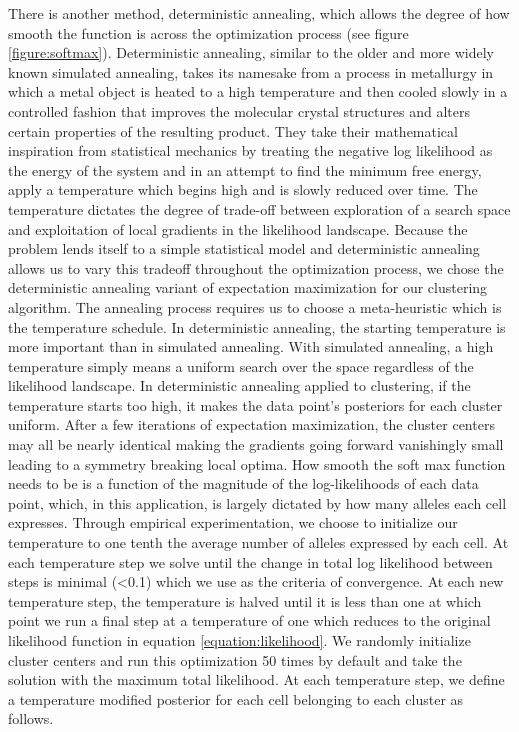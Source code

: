 \par{
There is another method, deterministic annealing, which allows the degree of how smooth the function is across the optimization process \cite{annealing}\cite{annealing2} (see figure \ref{figure:softmax}). Deterministic annealing, similar to the older and more widely known simulated annealing\cite{simannealing}, takes its namesake from a process in metallurgy in which a metal object is heated to a high temperature and then cooled slowly in a controlled fashion that improves the molecular crystal structures and alters certain properties of the resulting product. They take their mathematical inspiration from statistical mechanics by treating the negative log likelihood as the energy of the system and in an attempt to find the minimum free energy, apply a temperature which begins high and is slowly reduced over time. The temperature dictates the degree of trade-off between exploration of a search space and exploitation of local gradients in the likelihood landscape. Because the problem lends itself to a simple statistical model and deterministic annealing allows us to vary this tradeoff throughout the optimization process, we chose the deterministic annealing variant of expectation maximization for our clustering algorithm. The annealing process requires us to choose a meta-heuristic which is the temperature schedule. In deterministic annealing, the starting temperature is more important than in simulated annealing. With simulated annealing, a high temperature simply means a uniform search over the space regardless of the likelihood landscape. In deterministic annealing applied to clustering, if the temperature starts too high, it makes the data point's posteriors for each cluster uniform. After a few iterations of expectation maximization, the cluster centers may all be nearly identical making the gradients going forward vanishingly small leading to a symmetry breaking local optima. How smooth the soft max function needs to be is a function of the magnitude of the log-likelihoods of each data point, which, in this application, is largely dictated by how many alleles each cell expresses. Through empirical experimentation, we choose to initialize our temperature to one tenth the average number of alleles expressed by each cell. At each temperature step we solve until the change in total log likelihood between steps is minimal (<0.1) which we use as the criteria of convergence. At each new temperature step, the temperature is halved until it is less than one at which point we run a final step at a temperature of one which reduces to the original likelihood function in equation \ref{equation:likelihood}.  We randomly initialize cluster centers and run this optimization 50 times by default and take the solution with the maximum total likelihood. At each temperature step, we define a temperature modified posterior for each cell belonging to each cluster as follows.
}

